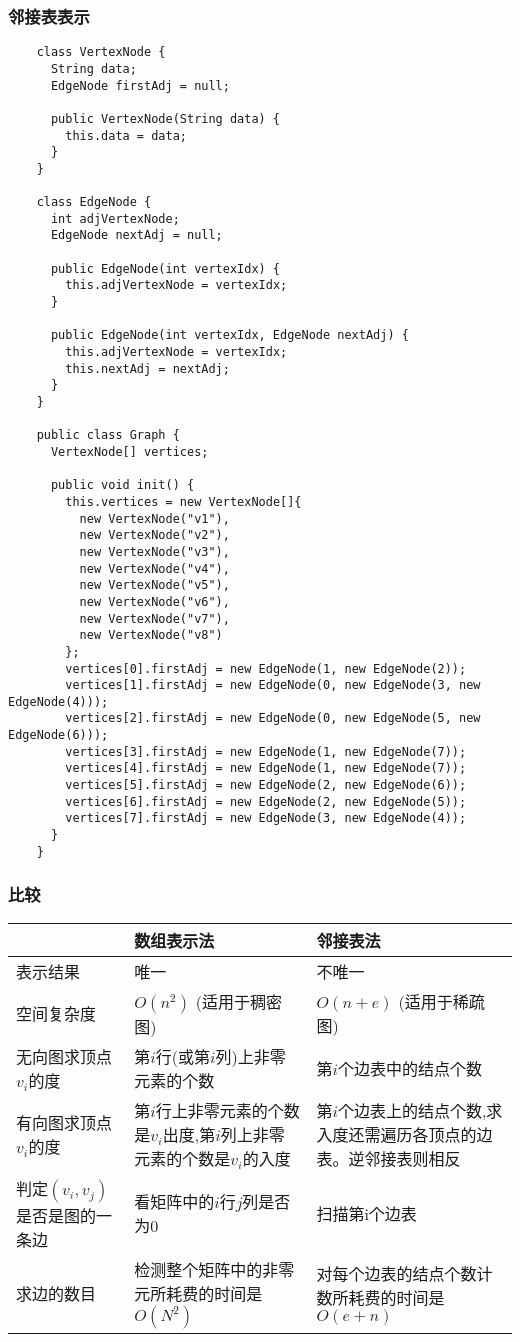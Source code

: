 \begin{frame}
  \frametitle{邻接表表示}
  \scriptsize
  \begin{verbatim}
    class VertexNode {
      String data;
      EdgeNode firstAdj = null;

      public VertexNode(String data) {
        this.data = data;
      }
    }

    class EdgeNode {
      int adjVertexNode;
      EdgeNode nextAdj = null;

      public EdgeNode(int vertexIdx) {
        this.adjVertexNode = vertexIdx;
      }

      public EdgeNode(int vertexIdx, EdgeNode nextAdj) {
        this.adjVertexNode = vertexIdx;
        this.nextAdj = nextAdj;
      }
    }
    
    public class Graph {
      VertexNode[] vertices;

      public void init() {
        this.vertices = new VertexNode[]{
          new VertexNode("v1"),
          new VertexNode("v2"),
          new VertexNode("v3"),
          new VertexNode("v4"),
          new VertexNode("v5"),
          new VertexNode("v6"),
          new VertexNode("v7"),
          new VertexNode("v8")
        };
        vertices[0].firstAdj = new EdgeNode(1, new EdgeNode(2));
        vertices[1].firstAdj = new EdgeNode(0, new EdgeNode(3, new EdgeNode(4)));
        vertices[2].firstAdj = new EdgeNode(0, new EdgeNode(5, new EdgeNode(6)));
        vertices[3].firstAdj = new EdgeNode(1, new EdgeNode(7));
        vertices[4].firstAdj = new EdgeNode(1, new EdgeNode(7));
        vertices[5].firstAdj = new EdgeNode(2, new EdgeNode(6));
        vertices[6].firstAdj = new EdgeNode(2, new EdgeNode(5));
        vertices[7].firstAdj = new EdgeNode(3, new EdgeNode(4));
      }
    }
  \end{verbatim}
\end{frame}

\begin{frame}[fragile]
  \frametitle{比较}
  \small
  \begin{tabular}{| p{2cm} | p{4cm} | p{4cm} |}
    \hline
    ~ & 数组表示法 & 邻接表法 \\ \hline
    表示结果 & 唯一 & 不唯一 \\ \hline
    空间复杂度 & $O(n^2)$ (适用于稠密图) & $O(n+e)$ (适用于稀疏图) \\ \hline
    无向图求顶点$v_i$的度 & 第$i$行(或第$i$列)上非零元素的个数 & 第$i$个边表中的结点个数 \\ \hline
    有向图求顶点$v_i$的度  & 第$i$行上非零元素的个数是$v_i$出度,第$i$列上非零元素的个数是$v_i$的入度 & 第$i$个边表上的结点个数,求入度还需遍历各顶点的边表。逆邻接表则相反\\ \hline
    判定$(v_i, v_j)$是否是图的一条边 &  看矩阵中的$i$行$j$列是否为0 & 扫描第i个边表 \\ \hline
    求边的数目 & 检测整个矩阵中的非零元所耗费的时间是$O(N^2)$ & 对每个边表的结点个数计数所耗费的时间是$O(e+n)$ \\ \hline
  \end{tabular}  
\end{frame}

